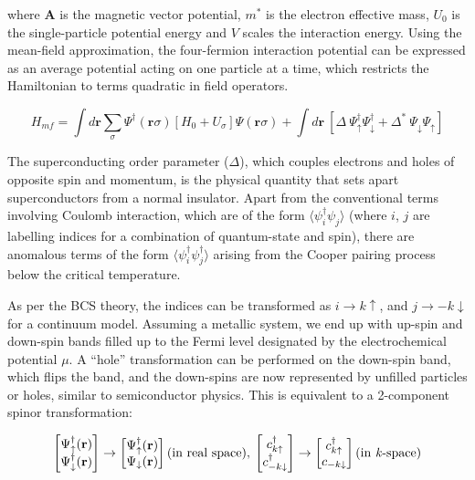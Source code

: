where $\textbf{A}$ is the magnetic vector potential, $m^{*}$ is the electron effective mass, $U_{0}$ is the single-particle potential energy and $V$ scales the interaction energy. Using the mean-field approximation, the four-fermion interaction potential can be expressed as an average potential acting on one particle at a time, which restricts the Hamiltonian to terms quadratic in field operators.

\begin{equation*}
        H_{mf} = \int d\textbf{r} \sum_{\sigma}\Psi^{\dagger}(\textbf{r}\sigma)[H_{0}+U_{\sigma}]\Psi(\textbf{r}\sigma) + \int d\textbf{r} \: [\Delta \: \Psi^{\dagger}_{\uparrow} \Psi^{\dagger}_{\downarrow} + \Delta^{*} \: \Psi_{\downarrow} \Psi_{\uparrow}]
\end{equation*}

The superconducting order parameter ($\Delta$), which couples electrons and holes of opposite spin and momentum, is the physical quantity that sets apart superconductors from a normal insulator. Apart from the conventional terms involving Coulomb interaction, which are of the form $\langle \psi_{i}^{\dagger}\psi_{j} \rangle$ (where $i$, $j$ are labelling indices for a combination of quantum-state and spin), there are anomalous terms of the form $\langle \psi_{i}^{\dagger}\psi_{j}^{\dagger} \rangle$ arising from the Cooper pairing process below the critical temperature. \par 

As per the BCS theory, the indices can be transformed as $i \rightarrow k \uparrow$, and $j \rightarrow -k \downarrow$ for a continuum model. Assuming a metallic system, we end up with up-spin and down-spin bands filled up to the Fermi level designated by the electrochemical potential $\mu$. A ``hole'' transformation can be performed on the down-spin band, which flips the band, and the down-spins are now represented by unfilled particles or holes, similar to semiconductor physics. This is equivalent to a 2-component spinor transformation:

\begin{equation}
    \begin{bmatrix}
        \Psi^{\dagger}_{\uparrow}(\textbf{r}) \\
        \Psi^{\dagger}_{\downarrow}(\textbf{r})
     \end{bmatrix} \rightarrow
     \begin{bmatrix}
        \Psi^{\dagger}_{\uparrow}(\textbf{r})\\
        \Psi_{\downarrow}(\textbf{r})
     \end{bmatrix} (\text{in real space}), \: 
     \begin{bmatrix}
        c^{\dagger}_{k \uparrow} \\
        c^{\dagger}_{-k \downarrow}    
     \end{bmatrix} \rightarrow
     \begin{bmatrix}
        c^{\dagger}_{k\uparrow} \\
        c_{-k\downarrow}   
     \end{bmatrix} (\text{in \textit{k}-space})
\end{equation}


